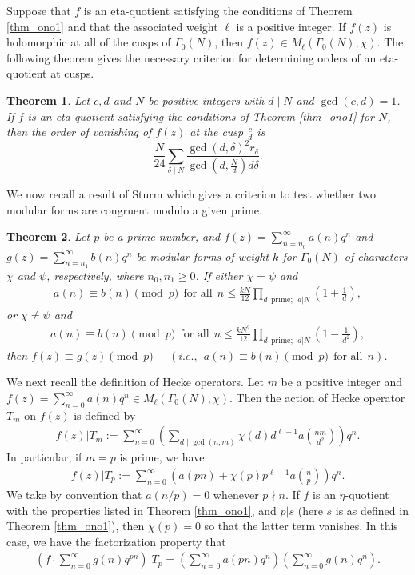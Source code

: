 \documentclass[reqno]{amsart}
\newtheorem{theorem}{Theorem}[section]
\theoremstyle{definition}
\theoremstyle{remark}
\numberwithin{equation}{section}
\begin{document}
Suppose that $f$ is an eta-quotient satisfying the conditions of Theorem \ref{thm_ono1} and that the associated weight $\ell$ is a positive integer. If $f(z)$ is holomorphic at all of the cusps of $\Gamma_0(N)$, then $f(z)\in M_{\ell}(\Gamma_0(N), \chi)$. 
The following theorem gives the necessary criterion for determining orders of an eta-quotient at cusps.
\begin{theorem}\cite[Theorem 1.65]{ono2004}\label{thm_ono2}
	Let $c, d$ and $N$ be positive integers with $d\mid N$ and $\gcd(c, d)=1$. If $f$ is an eta-quotient satisfying the conditions of Theorem \ref{thm_ono1} for $N$, then the 
	order of vanishing of $f(z)$ at the cusp $\frac{c}{d}$ 
	is $$\frac{N}{24}\sum_{\delta\mid N}\frac{\gcd(d,\delta)^2r_{\delta}}{\gcd(d,\frac{N}{d})d\delta}.$$
\end{theorem}
We now recall a result of Sturm \cite{Sturm1984} which gives a criterion to test whether two modular forms are congruent modulo a given prime.
\begin{theorem}\label{Sturm}
	Let $p$ be a prime number, and $f(z)=\sum_{n=n_0}^\infty a(n)q^n$ and $g(z)=\sum_{n=n_1}^\infty b(n)q^n$ be modular forms of weight $k$ for $\Gamma_0(N)$ of characters $\chi$ and $\psi$, respectively, where $n_0, n_1\geq 0$. If either $\chi=\psi$ and 
	\begin{align*}
	a(n)\equiv b(n)\pmod p~~ \text{for all}~~ n\leq \frac{kN}{12}\prod_{d~~ \text{prime};~~ d|N}\left(1+\frac{1}{d}\right),
	\end{align*}
	or $\chi\neq\psi$ and 
	\begin{align*}
	a(n)\equiv b(n)\pmod p~~ \text{for all}~~ n\leq \frac{kN^2}{12}\prod_{d~~ \text{prime};~~ d|N}\left(1-\frac{1}{d^2}\right),
	\end{align*}
	then $f(z)\equiv g(z)\pmod p$~~ $(i.e.,~~a(n)\equiv b(n)\pmod p~~\text{for all}~~n)$.
\end{theorem}
\par We next recall the definition of Hecke operators.
Let $m$ be a positive integer and $f(z) = \sum_{n=0}^{\infty} a(n)q^n \in M_{\ell}(\Gamma_0(N),\chi)$. Then the action of Hecke operator $T_m$ on $f(z)$ is defined by 
\begin{align*}
f(z)|T_m := \sum_{n=0}^{\infty} \left(\sum_{d\mid \gcd(n,m)}\chi(d)d^{\ell-1}a\left(\frac{nm}{d^2}\right)\right)q^n.
\end{align*}
In particular, if $m=p$ is prime, we have 
\begin{align*}
f(z)|T_p := \sum_{n=0}^{\infty} \left(a(pn)+\chi(p)p^{\ell-1}a\left(\frac{n}{p}\right)\right)q^n.
\end{align*}
We take by convention that $a(n/p)=0$ whenever $p \nmid n$.
If $f$ is an $\eta$-quotient with the properties listed in Theorem \ref{thm_ono1}, and $p|s$ (here $s$ is as defined in Theorem \ref{thm_ono1}), then $\chi(p)=0$ so that the latter term vanishes. In this case, we have the factorization property that
\begin{align*}
\left(f\cdot\sum_{n=0}^\infty g(n)q^{pn}\right)|T_p=\left(\sum_{n=0}^\infty a(pn)q^{n}\right)\left(\sum_{n=0}^\infty g(n)q^{n}\right).
\end{align*}
\end{document}
